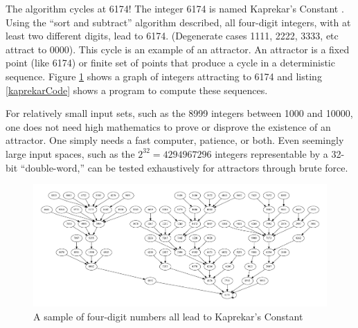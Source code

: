 \documentclass{book}
\begin{document}
The algorithm cycles at 6174! The integer 6174 is named Kaprekar's Constant \cite{seligman_6174}. Using the ``sort and subtract'' algorithm described, all four-digit integers, with at least two different digits, lead to 6174. (Degenerate cases 1111, 2222, 3333, etc attract to 0000). This cycle is an example of an attractor. An attractor is a fixed point (like 6174) or finite set of points that produce a cycle in a deterministic sequence. Figure \ref{kaprekarTree} shows a graph of integers attracting to 6174 and listing \ref{kaprekarCode} shows a program to compute these sequences.

For relatively small input sets, such as the 8999 integers between 1000 and 10000, one does not need high mathematics to prove or disprove the existence of an attractor. One simply needs a fast computer, patience, or both. Even seemingly large input spaces, such as the $2^{32} = 4294967296$ integers representable by a 32-bit ``double-word,'' can be tested exhaustively for attractors through brute force.

\begin{figure}[H]
\centering
\includegraphics[width=\columnwidth]{figures/kaprekar}
\caption{A sample of four-digit numbers all lead to Kaprekar's Constant}
\label{kaprekarTree}
\end{figure}
\end{document}
